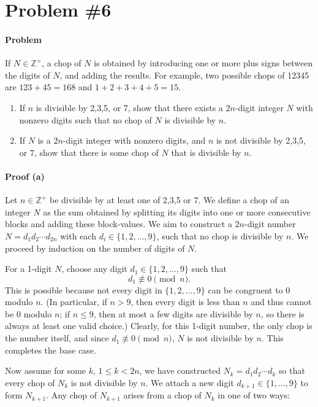 \documentclass[10pt]{article}
\theoremstyle{plain}
\theoremstyle{definition}
\theoremstyle{remark}
\begin{document}
\section{Problem \#6}

\paragraph{Problem} If \(N\in\mathbb{Z}^+\), a chop of \(N\) is obtained by introducing one or more plus signs between the digits of \(N\), and adding the results. For example, two possible chops of 12345 are \(123+45=168\) and \(1+2+3+4+5=15\).

\begin{enumerate}[label=(\alph*)]
	\item If \(n\) is divisible by 2,3,5, or 7, show that there exists a \(2n\)-digit integer \(N\) with nonzero digits such that no chop of \(N\) is divisible by \(n\).
	\item If \(N\) is a \(2n\)-digit integer with nonzero digits, and \(n\) is not divisible by 2,3,5, or 7, show that there is some chop of \(N\) that is divisible by \(n\).
\end{enumerate}

\paragraph{Proof (a)} Let \(n\in\mathbb{Z^+}\) be divisible by at least one of 2,3,5 or 7. We define a chop of an integer \(N\) as the sum obtained by splitting its digits into one or more consecutive blocks and adding these block-values. We aim to construct a \(2n\)-digit number \(N=d_1d_2\cdots d_{2n}\) with each \(d_i \in \{1,2,\ldots,9\}\), such that no chop is divisible by \(n\). We proceed by induction on the number of digits of \(N\).

For a 1-digit \(N\), choose any digit \(d_1 \in \{1,2,\dots,9\}\) such that 
\[
d_1 \not\equiv 0 \pmod{n}.
\]
This is possible because not every digit in \(\{1,2,\dots,9\}\) can be congruent to \(0\) modulo \(n\). (In particular, if \(n>9\), then every digit is less than \(n\) and thus cannot be \(0\) modulo \(n\); if \(n\le9\), then at most a few digits are divisible by \(n\), so there is always at least one valid choice.) Clearly, for this 1-digit number, the only chop is the number itself, and since \(d_1 \not\equiv 0\pmod{n}\), \(N\) is not divisible by \(n\). This completes the base case.

Now assume for some \(k\), \(1 \leqslant k < 2n\), we have constructed \(N_k = d_1d_2\cdots d_k\) so that every chop of \(N_k\) is not divisible by \(n\). We attach a new digit \(d_{k+1}\in \{1,\dots,9\}\) to form \(N_{k+1}\). Any chop of \(N_{k+1}\) arises from a chop of \(N_k\) in one of two ways:
\end{document}
